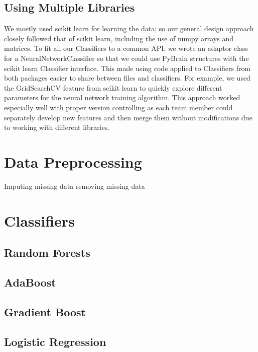 \documentclass{article}
\begin{document}
\subsection{Using Multiple Libraries}

We mostly used scikit learn for learning the data; so our general design approach closely followed that of scikit learn, including the use of numpy arrays and matrices.
To fit all our Classifiers to a common API, we wrote an adaptor class for a NeuralNetworkClassifier so that we could use PyBrain structures with the scikit learn Classifier interface.
This made using code applied to Classifiers from both packages easier to share between files and classifiers.
For example, we used the GridSearchCV feature from scikit learn to quickly explore different parameters for the neural network training algorithm.
This approach worked especially well with proper version controlling as each team member could separately develop new features and then merge them without modifications due to working with different libraries.



\section{Data Preprocessing}
Imputing missing data
removing missing data


\section{Classifiers}
\subsection{Random Forests}

\subsection{AdaBoost}

\subsection{Gradient Boost}

\subsection{Logistic Regression}
\end{document}
